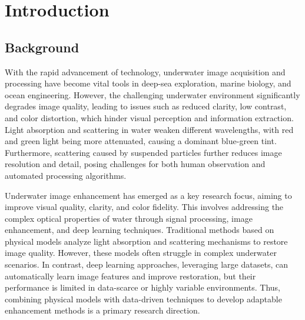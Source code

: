\documentclass[withoutpreface,bwprint]{cumcmthesis}
\newcommand{\applyheader}{
    \afterpage{
        \pagestyle{fancy} %
    }
}
\begin{document}

\begin{center}
    \tableofcontents  %
\end{center}

\cleardoublepage  %

\newpage
\applyheader

\section{Introduction}

\subsection{Background}

With the rapid advancement of technology, underwater image acquisition and processing have become vital tools in deep-sea exploration, marine biology, and ocean engineering. However, the challenging underwater environment significantly degrades image quality, leading to issues such as reduced clarity, low contrast, and color distortion, which hinder visual perception and information extraction. Light absorption and scattering in water weaken different wavelengths, with red and green light being more attenuated, causing a dominant blue-green tint. Furthermore, scattering caused by suspended particles further reduces image resolution and detail, posing challenges for both human observation and automated processing algorithms.

Underwater image enhancement has emerged as a key research focus, aiming to improve visual quality, clarity, and color fidelity. This involves addressing the complex optical properties of water through signal processing, image enhancement, and deep learning techniques. Traditional methods based on physical models analyze light absorption and scattering mechanisms to restore image quality. However, these models often struggle in complex underwater scenarios. In contrast, deep learning approaches, leveraging large datasets, can automatically learn image features and improve restoration, but their performance is limited in data-scarce or highly variable environments. Thus, combining physical models with data-driven techniques to develop adaptable enhancement methods is a primary research direction.
\end{document}
